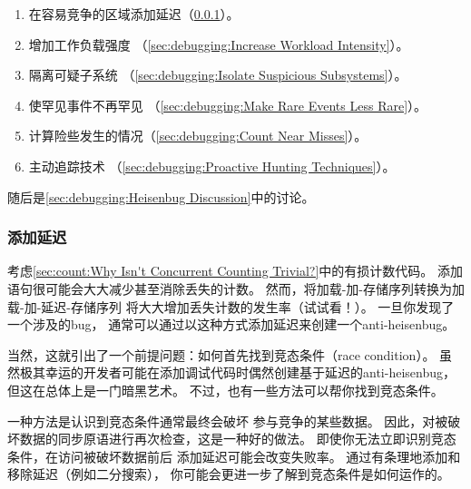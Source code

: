 \begin{enumerate}
\item	在容易竞争的区域添加延迟（\cref{sec:debugging:Add Delay}）。
\item	增加工作负载强度
	（\cref{sec:debugging:Increase Workload Intensity}）。
\item	隔离可疑子系统
	（\cref{sec:debugging:Isolate Suspicious Subsystems}）。
\item	使罕见事件不再罕见
	（\cref{sec:debugging:Make Rare Events Less Rare}）。
\item	计算险些发生的情况（\cref{sec:debugging:Count Near Misses}）。
\item	主动追踪技术
	（\cref{sec:debugging:Proactive Hunting Techniques}）。
\end{enumerate}

随后是\cref{sec:debugging:Heisenbug Discussion}中的讨论。

\subsubsection{添加延迟}
\label{sec:debugging:Add Delay}

考虑\cref{sec:count:Why Isn't Concurrent Counting Trivial?}中的有损计数代码。
添加语句很可能会大大减少甚至消除丢失的计数。
然而，将加载-加-存储序列转换为加载-加-延迟-存储序列
将大大增加丢失计数的发生率（试试看！）。
一旦你发现了一个涉及的bug，
通常可以通过以这种方式添加延迟来创建一个anti-heisenbug。

当然，这就引出了一个前提问题：如何首先找到竞态条件（race condition）。
虽然极其幸运的开发者可能在添加调试代码时偶然创建基于延迟的anti-heisenbug，
但这在总体上是一门暗黑艺术。
不过，也有一些方法可以帮你找到竞态条件。

一种方法是认识到竞态条件通常最终会破坏
参与竞争的某些数据。
因此，对被破坏数据的同步原语进行再次检查，这是一种好的做法。
即使你无法立即识别竞态条件，在访问被破坏数据前后
添加延迟可能会改变失败率。
通过有条理地添加和移除延迟（例如二分搜索），
你可能会更进一步了解到竞态条件是如何运作的。

\QuickQuizEnd

